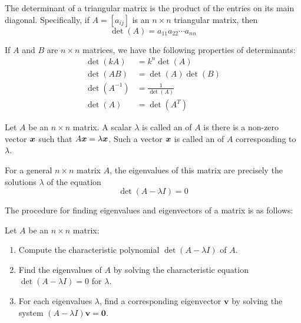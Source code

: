 \begin{theorem}
	The determinant of a triangular matrix is the product of the entries on its main diagonal. Specifically, if $A = [a_{ij}]$ is an $n \times n$ triangular matrix, then
	\[
	\det(A) = a_{11} a_{22} \cdots a_{nn}
	\]
\end{theorem}

\begin{theorem}
	If $A$ and $B$ are $n \times n$ matrices, we have the following properties of determinants:
	\begin{align*}
		\det(kA) &= k^n \det(A) \\
		\det(AB) &= \det(A) \det(B) \\
		\det(A^{-1}) &= \frac{1}{\det(A)} \\
		\det(A) &= \det(A^T)
	\end{align*}
\end{theorem}

\begin{definition}
	Let $A$ be an $n \times n$ matrix. A scalar $\lambda$ is called an  of $A$ is there is a non-zero vector $\bm{x}$ such that $A\bm{x} = \lambda\bm{x}$. Such a vector $\bm{x}$ is called an  of $A$ corresponding to $\lambda$.
\end{definition}

For a general $n \times n$ matrix $A$, the eigenvalues of this matrix are precisely the solutions $\lambda$ of the equation
\[
\det(A-\lambda I) = 0
\]

The procedure for finding eigenvalues and eigenvectors of a matrix is as follows:

Let $A$ be an $n \times n$ matrix:
\begin{enumerate}
	\item Compute the characteristic polynomial $\det(A - \lambda I)$ of $A$.
	\item Find the eigenvalues of $A$ by solving the characteristic equation $\det(A - \lambda I) = 0$ for $\lambda$.
	\item For each eigenvalues $\lambda$, find a corresponding eigenvector $\bm{v}$ by solving the system $(A-\lambda I)\bm{v} = \bm{0}$.
\end{enumerate}

